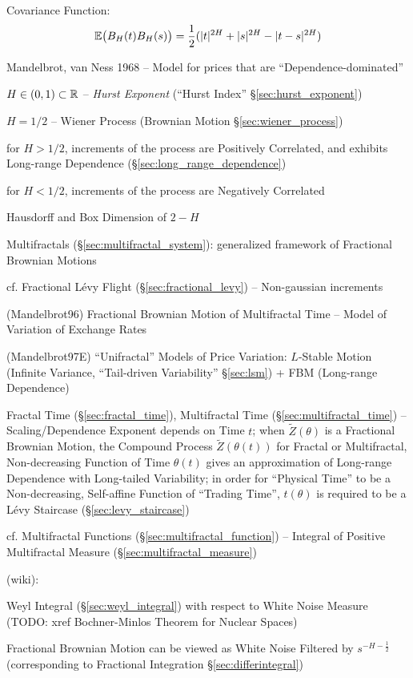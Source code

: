 Covariance Function:
\[
  \mathbb{E}\big(B_H(t) B_H(s)\big) =
    \frac{1}{2} (|t|^{2H} + |s|^{2H} - |t - s|^{2H})
\]

Mandelbrot, van Ness 1968 -- Model for prices that are ``Dependence-dominated''

$H \in (0,1) \subset \mathbb{R}$ -- \emph{Hurst Exponent} (``Hurst Index''
\S\ref{sec:hurst_exponent})

$H = 1/2$ -- Wiener Process (Brownian Motion \S\ref{sec:wiener_process})

for $H > 1/2$, increments of the process are Positively Correlated, and exhibits
Long-range Dependence (\S\ref{sec:long_range_dependence})

for $H < 1/2$, increments of the process are Negatively Correlated

Hausdorff and Box Dimension of $2 - H$

\fist Multifractals (\S\ref{sec:multifractal_system}): generalized framework of
Fractional Brownian Motions

cf. Fractional L\'evy Flight (\S\ref{sec:fractional_levy}) -- Non-gaussian
increments

(Mandelbrot96) Fractional Brownian Motion of Multifractal Time -- Model of
Variation of Exchange Rates

(Mandelbrot97E) ``Unifractal'' Models of Price Variation: $L$-Stable Motion
(Infinite Variance, ``Tail-driven Variability'' \S\ref{sec:lsm}) + FBM
(Long-range Dependence)

\fist Fractal Time (\S\ref{sec:fractal_time}), Multifractal Time
(\S\ref{sec:multifractal_time}) -- Scaling/Dependence Exponent depends on Time
$t$; when $\tilde{Z}(\theta)$ is a Fractional Brownian Motion, the Compound
Process $\tilde{Z}(\theta(t))$ for Fractal or Multifractal, Non-decreasing
Function of Time $\theta(t)$ gives an approximation of Long-range Dependence
with Long-tailed Variability; in order for ``Physical Time'' to be a
Non-decreasing, Self-affine Function of ``Trading Time'', $t(\theta)$ is
required to be a L\'evy Staircase (\S\ref{sec:levy_staircase})

cf. Multifractal Functions (\S\ref{sec:multifractal_function}) -- Integral of
Positive Multifractal Measure (\S\ref{sec:multifractal_measure})

(wiki):

Weyl Integral (\S\ref{sec:weyl_integral}) with respect to White Noise Measure
(TODO: xref Bochner-Minlos Theorem for Nuclear Spaces)

Fractional Brownian Motion can be viewed as White Noise Filtered by
$s^{-H-\frac{1}{2}}$ (corresponding to Fractional Integration
\S\ref{sec:differintegral})

